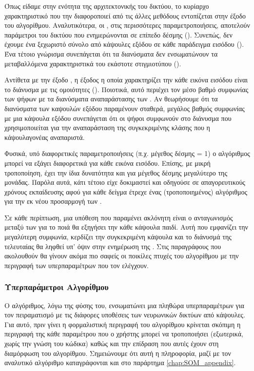 Όπως είδαμε στην ενότητα της αρχιτεκτονικής του δικτύου, το κυρίαρχο χαρακτηριστικό που την διαφοροποιεί από τις άλλες μεθόδους εντοπίζεται στην έξοδο του αλγορίθμου. Αναλυτικότερα, οι , στις περισσότερες παραμετροποιήσεις, αποτελούν παράμετροι του δικτύου που ενημερώνονται σε επίπεδο δέσμης (). Συνεπώς, δεν έχουμε ένα ξεχωριστό σύνολο από κάψουλες εξόδου σε κάθε παράδειγμα εισόδου (). Ένα τέτοιο γνώρισμα συνεπάγεται ότι τα διανύσματα  δεν ενσωματώνουν τα μεταβαλλόμενα χαρακτηριστικά του εκάστοτε στιγμιοτύπου ().\par

Αντίθετα με την έξοδο , η έξοδος η οποία χαρακτηρίζει την κάθε εικόνα εισόδου είναι το διάνυσμα με τις ομοιότητες (). Ποιοτικά, αυτό περιέχει τον μέσο βαθμό συμφωνίας των ψήφων με τα διανύσματα αναπαράστασης των . Αν θεωρήσουμε ότι τα διανύσματα των καψουλών εξόδου παραμένουν σταθερά, μεγάλος βαθμός συμφωνίας με μια κάψουλα εξόδου συνεπάγεται ότι οι ψήφοι συμφωνούν στο διάνυσμα που χρησιμοποιείται για την αναπαράσταση της συγκεκριμένης κλάσης που η κάψουλα\textendash γονέας αναπαριστά.\par

Φυσικά, υπό διαφορετικές παραμετροποιήσεις (π.χ. μέγεθος δέσμης = 1) ο αλγόριθμος μπορεί να εξάγει διαφορετικά  για κάθε εικόνα εισόδου. Επίσης, με μικρή τροποποίηση, έχει την ίδια δυνατότητα και για μέγεθος δέσμης μεγαλύτερο της μονάδας. Παρόλα αυτά, κάτι τέτοιο είχε δοκιμαστεί και οδηγούσε σε απαγορευτικούς χρόνους εκπαίδευσης αφού για κάθε δείγμα έτρεχε ένας (τροποποιημένος) αλγόριθμος  για την εκ νέου προσαρμογή των .\par 

Σε κάθε περίπτωση, μια υπόθεση που παραμένει ακλόνητη είναι ο ανταγωνισμός μεταξύ των  για το ποιά θα εξηγήσει την κάθε κάψουλα παιδί. Αυτή που εμφανίζει την μεγαλύτερη συμφωνία, κερδίζει την συγκεκριμένη κάψουλα και το διάνυσμά της τελευταίας θα ληφθεί υπ' όψιν στην ενημέρωση της . Στις παραγράφους που ακολουθούν θα γίνουν ακόμα πιο σαφείς οι ποικίλες πτυχές του αλγορίθμου με την περιγραφή των υπερπαραμέτρων που τον ελέγχουν.
 
\subsubsection{Υπερπαράμετροι Αλγορίθμου}

Ο αλγόριθμος, λόγω της φύσης του, ενσωματώνει μια πληθώρα υπερπαραμέτρων για τον πειραματισμό με τις διάφορες υποθέσεις των νευρωνικών δικτύων από κάψουλες. Για αυτό, πριν γίνει η φορμαλιστική περιγραφή του αλγορίθμου κρίνεται σκόπιμη η περιγραφή της κάθε παραμέτρου που ο χρήστης μπορεί να τροποποιήσει (εξωτερικά, χωρίς την γνώση του κώδικα) καθώς και την επίδραση που αυτές έχουν στη διαμόρφωση του αλγορίθμου. Σημειώνουμε ότι αυτή η πληροφορία, μαζί με τον αναλυτικό αλγόριθμο καταγράφονται και στο παράρτημα \ref{chap:SOM_appendix}.\par

